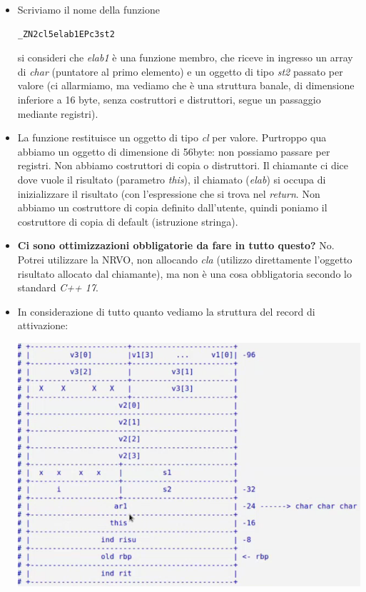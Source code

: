 \documentclass[11pt]{report}
\theoremstyle{definition}
\begin{document}
\begin{itemize}
\item Scriviamo il nome della funzione
\begin{verbatim}
_ZN2cl5elab1EPc3st2
\end{verbatim}
si consideri che \emph{elab1} è una funzione membro, che riceve in ingresso un array di \emph{char} (puntatore al primo elemento) e un oggetto di tipo \emph{st2} passato per valore (ci allarmiamo, ma vediamo che è una struttura banale, di dimensione inferiore a 16 byte, senza costruttori e distruttori, segue un passaggio mediante registri). 
\item La funzione restituisce un oggetto di tipo \emph{cl} per valore. Purtroppo qua abbiamo un oggetto di dimensione di 56byte: non possiamo passare per registri. Non abbiamo costruttori di copia o distruttori. Il chiamante ci dice dove vuole il risultato (parametro \emph{this}), il chiamato (\emph{elab}) si occupa di inizializzare il risultato (con l'espressione che si trova nel \emph{return}. Non abbiamo un costruttore di copia definito dall'utente, quindi poniamo il costruttore di copia di default (istruzione stringa).
\item \textbf{Ci sono ottimizzazioni obbligatorie da fare in tutto questo?} No. Potrei utilizzare la NRVO, non allocando \emph{cla} (utilizzo direttamente l'oggetto risultato allocato dal chiamante), ma non è una cosa obbligatoria secondo lo standard \emph{C++ 17}.
\item In considerazione di tutto quanto vediamo la struttura del record di attivazione:\begin{center}
\includegraphics{img/48.PNG}

\end{center}
\end{itemize}
\end{document}
